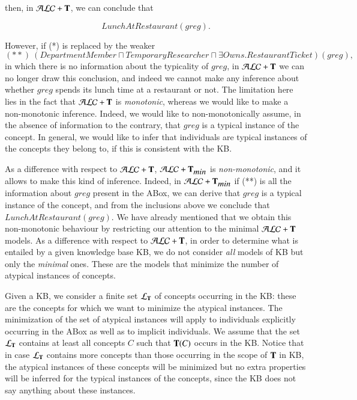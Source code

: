 \documentclass[a4paper, 11pt, oneside]{elsarticle}
\newcommand{\tip}{{\bf T}}
\newcommand{\alct}{\mathcal{ALC}+\tip}
\newcommand{\alctmin}{\mathcal{ALC}+\tip_{\mbox{\em min}}}
\newcommand{\ellet} {\mathcal{L}_{\bf T}}
\begin{document}
\noindent then, in $\alct$, we can conclude
that

$$\mathit{LunchAtRestaurant(\mathit{greg})}.$$

\noindent However, if (*) is replaced by the weaker
$$(**)  \ (\mathit{DepartmentMember} \sqcap \mathit{TemporaryResearcher} \sqcap \exists \mathit{Owns}.\mathit{RestaurantTicket})(\mathit{greg}),$$ in which
there is no information about the typicality of $\mathit{greg}$,
in $\alct$ we can no longer draw this conclusion, and indeed we
cannot make any inference about whether $\mathit{greg}$ spends its
lunch time at a restaurant or not. The limitation here lies in the
fact that $\alct$ is {\em monotonic}, whereas we would like to
make a non-monotonic inference. Indeed, we would like to
non-monotonically assume, in the absence of information to the
contrary, that $\mathit{greg}$ is a typical instance of the
concept. In general, we would like to infer that individuals are
typical instances of the concepts they belong to, if this is
consistent with the KB.

As a difference with respect to $\alct$, $\alctmin$ is {\em non-monotonic}, and it allows to make this kind of inference. Indeed, in $\alctmin$ if (**) is all the information about $\mathit{greg}$ present in the ABox, we can derive that $\mathit{greg}$ is a typical instance of the concept, and from the inclusions above we conclude that $\mathit{LunchAtRestaurant(\mathit{greg})}.$
 We have already mentioned that we obtain this non-monotonic behaviour by restricting our attention to the  minimal $\alct$ models. As a difference with respect to $\alct$,
 in order to determine what is entailed by  a given knowledge base KB, we do not consider {\em all} models of KB but only the {\em minimal} ones. These are the models that minimize the number of atypical instances of  concepts.

Given a KB, we consider a finite set $\ellet$ of concepts
occurring in the KB: these are the concepts for which we want to
minimize the atypical instances.
The minimization of the set of atypical instances will apply to
individuals explicitly occurring in the ABox as well as to
implicit individuals. We assume that the set $\ellet$ contains at
least all concepts $C$ such that $\tip(C)$ occurs in the KB.
Notice that in case $\ellet$ contains more concepts than
those occurring in the scope of $\tip$ in KB, the atypical
instances of these concepts will be minimized but no extra
properties will be inferred for the typical instances of the
concepts, since the KB does not say anything about these
instances.
\end{document}
